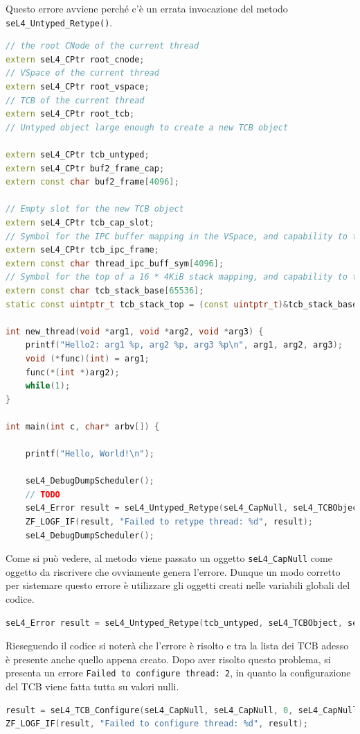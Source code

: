 Questo errore avviene perché c'è un errata invocazione del metodo \texttt{seL4\_Untyped\_Retype()}.
\begin{lstlisting}[language=C++]
// the root CNode of the current thread
extern seL4_CPtr root_cnode;
// VSpace of the current thread
extern seL4_CPtr root_vspace;
// TCB of the current thread
extern seL4_CPtr root_tcb;
// Untyped object large enough to create a new TCB object

extern seL4_CPtr tcb_untyped;
extern seL4_CPtr buf2_frame_cap;
extern const char buf2_frame[4096];

// Empty slot for the new TCB object
extern seL4_CPtr tcb_cap_slot;
// Symbol for the IPC buffer mapping in the VSpace, and capability to the mapping
extern seL4_CPtr tcb_ipc_frame;
extern const char thread_ipc_buff_sym[4096];
// Symbol for the top of a 16 * 4KiB stack mapping, and capability to the mapping
extern const char tcb_stack_base[65536];
static const uintptr_t tcb_stack_top = (const uintptr_t)&tcb_stack_base + sizeof(tcb_stack_base);

int new_thread(void *arg1, void *arg2, void *arg3) {
    printf("Hello2: arg1 %p, arg2 %p, arg3 %p\n", arg1, arg2, arg3);
    void (*func)(int) = arg1;
    func(*(int *)arg2);
    while(1);
}

int main(int c, char* arbv[]) {

    printf("Hello, World!\n");

    seL4_DebugDumpScheduler();
	// TODO
    seL4_Error result = seL4_Untyped_Retype(seL4_CapNull, seL4_TCBObject, seL4_TCBBits, seL4_CapNull, 0, 0, seL4_CapNull, 1);
    ZF_LOGF_IF(result, "Failed to retype thread: %d", result);
    seL4_DebugDumpScheduler();
\end{lstlisting}

Come si può vedere, al metodo viene passato un oggetto \texttt{seL4\_CapNull} come oggetto da riscrivere che ovviamente genera l'errore. Dunque un modo corretto per sistemare questo errore è utilizzare gli oggetti creati nelle variabili globali del codice.
\begin{lstlisting}[language=C++]
seL4_Error result = seL4_Untyped_Retype(tcb_untyped, seL4_TCBObject, seL4_TCBBits, root_cnode, 0, 0, tcb_cap_slot, 1);
\end{lstlisting}

Rieseguendo il codice si noterà che l'errore è risolto e tra la lista dei TCB adesso è presente anche quello appena creato. Dopo aver risolto questo problema, si presenta un errore \texttt{Failed to configure thread: 2}, in quanto la configurazione del TCB viene fatta tutta su valori nulli.
\begin{lstlisting}[language=C++]
result = seL4_TCB_Configure(seL4_CapNull, seL4_CapNull, 0, seL4_CapNull, 0, 0, (seL4_Word) NULL, seL4_CapNull);
ZF_LOGF_IF(result, "Failed to configure thread: %d", result);
\end{lstlisting}

